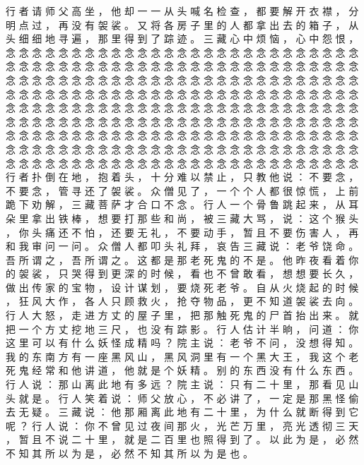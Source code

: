 {行 者 请 师 父 高 坐 ， 他 却 一 一 从 头 喊 名 检 查 ， 都 要 解 开 衣 襟 ， 分 明 点 过 ， 再 没 有 袈 裟 。
又 将 各 房 子 里 的 人 都 拿 出 去 的 箱 子 ， 从 头 细 细 地 寻 遍 ， 那 里 得 到 了 踪 迹 。
三 藏 心 中 烦 恼 ， 心 中 怨 恨 ， 念 念 念 念 念 念 念 念 念 念 念 念 念 念 念 念 念 念 念 念 念 念 念 念 念 念 念 念 念 念 念 念 念 念 念 念 念 念 念 念 念 念 念 念 念 念 念 念 念 念 念 念 念 念 念 念 念 念 念 念 念 念 念 念 念 念 念 念 念 念 念 念 念 念 念 念 念 念 念 念 念 念 念 念 念 念 念 念 念 念 念 念 念 念 念 念 念 念 念 念 念 念 念 念 念 念 念 念 念 念 念 念 念 念 念 念 念 念 念 念 念 念 念 念 念 念 念 念 念 念 念 念 念 念 念 念 念 念 念 念 念 念 念 念 念 念 念 念 念 念 念 念 念 念 念 念 念 念 念 念 念 念 念 念 念 念 念 念 念 念 念 念 念 念 念 念 念 念 念 念 念 念 念 念 念 念 念 念 念 念 念 念 念 念 念 念 念 念 念 念 念 念 念 念 念 念 念 念 念 念 念 念 念 念 念 念 念 念 念 念 念 念 念 念 念 念 念 念 念 念 念 念 念 念 念 念 念 念 念 念 念 念 念
行 者 扑 倒 在 地 ， 抱 着 头 ， 十 分 难 以 禁 止 ， 只 教 他 说 ： 不 要 念 ， 不 要 念 ， 管 寻 还 了 袈 裟 。
众 僧 见 了 ， 一 个 个 人 都 很 惊 慌 ， 上 前 跪 下 劝 解 ， 三 藏 菩 萨 才 合 口 不 念 。
行 人 一 个 骨 鲁 跳 起 来 ， 从 耳 朵 里 拿 出 铁 棒 ， 想 要 打 那 些 和 尚 ， 被 三 藏 大 骂 ， 说 ： 这 个 猴 头 ， 你 头 痛 还 不 怕 ， 还 要 无 礼 ， 不 要 动 手 ， 暂 且 不 要 伤 害 人 ， 再 和 我 审 问 一 问 。
众 僧 人 都 叩 头 礼 拜 ， 哀 告 三 藏 说 ： 老 爷 饶 命 。
吾 所 谓 之 ， 吾 所 谓 之 。
这 都 是 那 老 死 鬼 的 不 是 。
他 昨 夜 看 着 你 的 袈 裟 ， 只 哭 得 到 更 深 的 时 候 ， 看 也 不 曾 敢 看 ， 想 想 要 长 久 ， 做 出 传 家 的 宝 物 ， 设 计 谋 划 ， 要 烧 死 老 爷 。
自 从 火 烧 起 的 时 候 ， 狂 风 大 作 ， 各 人 只 顾 救 火 ， 抢 夺 物 品 ， 更 不 知 道 袈 裟 去 向 。
行 人 大 怒 ， 走 进 方 丈 的 屋 子 里 ， 把 那 触 死 鬼 的 尸 首 抬 出 来 。
就 把 一 个 方 丈 挖 地 三 尺 ， 也 没 有 踪 影 。
行 人 估 计 半 晌 ， 问 道 ： 你 这 里 可 以 有 什 么 妖 怪 成 精 吗 ？ 院 主 说 ： 老 爷 不 问 ， 没 想 得 知 。
我 的 东 南 方 有 一 座 黑 风 山 ， 黑 风 洞 里 有 一 个 黑 大 王 ， 我 这 个 老 死 鬼 经 常 和 他 讲 道 ， 他 就 是 个 妖 精 。
别 的 东 西 没 有 什 么 东 西 。
行 人 说 ： 那 山 离 此 地 有 多 远 ？ 院 主 说 ： 只 有 二 十 里 ， 那 看 见 山 头 就 是 。
行 人 笑 着 说 ： 师 父 放 心 ， 不 必 讲 了 ， 一 定 是 那 黑 怪 偷 去 无 疑 。
三 藏 说 ： 他 那 厢 离 此 地 有 二 十 里 ， 为 什 么 就 断 得 到 它 呢 ？ 行 人 说 ： 你 不 曾 见 过 夜 间 那 火 ， 光 芒 万 里 ， 亮 光 透 彻 三 天 ， 暂 且 不 说 二 十 里 ， 就 是 二 百 里 也 照 得 到 了 。
以 此 为 是 ， 必 然 不 知 其 所 以 为 是 ， 必 然 不 知 其 所 以 为 是 也 。
}
